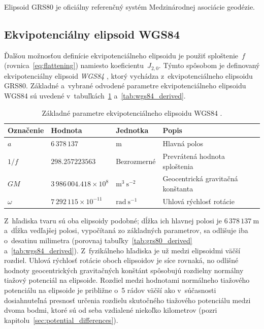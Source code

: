 \documentclass[a4paper, 12pt]{book}
\begin{document}
Elipsoid GRS80 je oficiálny referenčný systém Medzinárodnej asociácie geodézie.






\subsection{Ekvipotenciálny elipsoid WGS84}
\label{sec:wgs84}

Ďalšou možnosťou definície ekvipotenciálneho elipsoidu je použiť sploštenie~$f$ 
(rovnica~\ref{eq:flattening}) namiesto koeficientu~$J_{2,0}$.  Týmto spôsobom 
je definovaný ekvipotenciálny elipsoid \emph{WGS84} 
\parencite[angl. \textit{World Geodetic System~1984};][]{WGS84}, ktorý vychádza 
z~ekvipotenciálneho elipsoidu GRS80.  Základné a~vybrané odvodené parametre 
ekvipotenciálneho elipsoidu WGS84 sú uvedené 
v~tabuľkách~\ref{tab:wgs84_fundamental} a~\ref{tab:wgs84_derived}.

\begin{table}
\begin{center}
\caption{Základné parametre ekvipotenciálneho elipsoidu WGS84 
\parencite{WGS84}.}
\label{tab:wgs84_fundamental}
\small
\begin{tabular}{l l l l}
\hline
Označenie & Hodnota & Jednotka & Popis\\
\hline
$a$       & $6\,378\,137$ & m & Hlavná polos\\
$1 \slash f$ & $298.257223563$ & Bezrozmerné & Prevrátená hodnota sploštenia\\
$GM$ & $3\,986\,004.418 \times 10^8$ & $\mathrm{m}^3 \ \mathrm{s}^{-2}$ 
& Geocentrická gravitačná konštanta\\
$\omega$ & $7\,292\,115 \times 10^{-11}$ & $\mathrm{rad} \ \mathrm{s}^{-1}$ 
& Uhlová rýchlosť rotácie\\
\hline
\end{tabular}
\end{center}
\end{table}

Z~hľadiska tvaru sú oba elipsoidy podobné; dĺžka ich hlavnej polosi je $6\, 
378\, 137\ \mathrm{m}$ a~dĺžka vedľajšej polosi, vypočítaná zo základných 
parametrov, sa odlišuje iba o~desatinu milimetra (porovnaj 
tabuľky~\ref{tab:grs80_derived} a~\ref{tab:wgs84_derived}).  Z~fyzikálneho 
hľadiska je už medzi elipsoidmi väčší rozdiel.  Uhlová rýchlosť rotácie oboch 
elipsoidov je síce rovnaká, no odlišné hodnoty geocentrických gravitačných 
konštánt spôsobujú rozdielny normálny tiažový potenciál na elipsoide.  Rozdiel 
medzi hodnotami normálneho tiažového potenciálu na elipsoide je približne o~5 
rádov väčší ako v~súčasnosti dosiahnuteľná presnosť určenia rozdielu skutočného 
tiažového potenciálu medzi dvoma bodmi, ktoré sú od seba vzdialené niekoľko 
kilometrov (pozri kapitolu~\ref{sec:potential_differences}).
\end{document}
